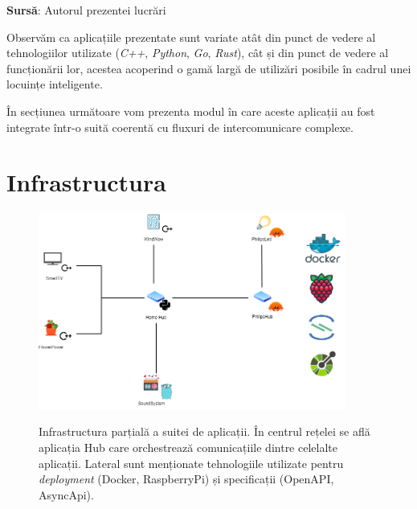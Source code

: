 \textbf{Sursă}: Autorul prezentei lucrări

Observăm ca aplicațiile prezentate sunt variate atât din punct de vedere al tehnologiilor utilizate (\textit{C++}, \textit{Python}, \textit{Go}, \textit{Rust}), cât și din punct de vedere al funcționării lor, acestea acoperind o gamă largă de utilizări posibile în cadrul unei locuințe inteligente. 

În secțiunea următoare vom prezenta modul în care aceste aplicații au fost integrate într-o suită coerentă cu fluxuri de intercomunicare complexe.

\section{Infrastructura}

\begin{figure}[h]
    \centering
    \caption{\centering Infrastructura parțială a suitei de aplicații. În centrul rețelei se află aplicația Hub care orchestrează comunicațiile dintre celelalte aplicații. Lateral sunt menționate tehnologiile utilizate pentru \textit{deployment} (Docker, RaspberryPi) și specificații (OpenAPI, AsyncApi).}
    \includegraphics[width=0.9\textwidth]{images/smarthome_dataset.drawio (1).png}
    \label{fig:app_dataset_infra}
\end{figure}

